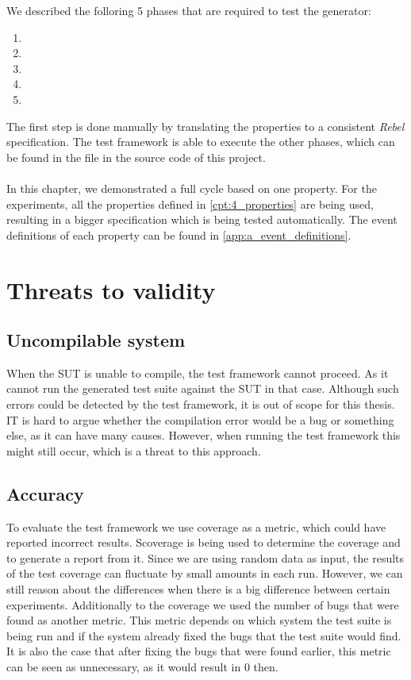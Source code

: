 We described the folloring 5 phases that are required to test the generator:
\begin{enumerate}
\item \tfPhaseOne{}
\item \tfPhaseTwo{}
\item \tfPhaseThree{}
\item \tfPhaseFour{}
\item \tfPhaseFive{}
\end{enumerate}
The first step is done manually by translating the properties to a consistent \textit{Rebel} specification. The test framework is able to execute the other phases, which can be found in the  file in the source code of this project.\\
\\
In this chapter, we demonstrated a full cycle based on one property. For the experiments, all the properties defined in \autoref{cpt:4_properties} are being used, resulting in a bigger specification which is being tested automatically. The event definitions of each property can be found in \autoref{app:a_event_definitions}.


\section{Threats to validity}

\subsection*{Uncompilable system}
When the SUT is unable to compile, the test framework cannot proceed. As it cannot run the generated test suite against the SUT in that case. Although such errors could be detected by the test framework, it is out of scope for this thesis. IT is hard to argue whether the compilation error would be a bug or something else, as it can have many causes. However, when running the test framework this might still occur, which is a threat to this approach.

\subsection*{Accuracy}
To evaluate the test framework we use coverage as a metric, which could have reported incorrect results. Scoverage is being used to determine the coverage and to generate a report from it. Since we are using random data as input, the results of the test coverage can fluctuate by small amounts in each run. However, we can still reason about the differences when there is a big difference between certain experiments. Additionally to the coverage we used the number of bugs that were found as another metric. This metric depends on which system the test suite is being run and if the system already fixed the bugs that the test suite would find. It is also the case that after fixing the bugs that were found earlier, this metric can be seen as unnecessary, as it would result in 0 then.

